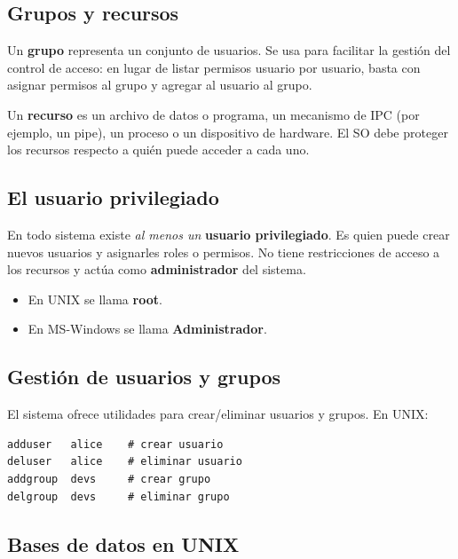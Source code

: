 \documentclass[11pt,a4paper]{article}
\begin{document}
\subsection{Grupos y recursos}

\begin{definicion}
Un \textbf{grupo} representa un conjunto de usuarios. Se usa para
facilitar la gestión del control de acceso: en lugar de listar
permisos usuario por usuario, basta con asignar permisos al grupo y
agregar al usuario al grupo.
\end{definicion}

Un \textbf{recurso} es un archivo de datos o programa, un mecanismo de
IPC (por ejemplo, un pipe), un proceso o un dispositivo de hardware.
El SO debe proteger los recursos respecto a quién puede acceder a
cada uno.

\subsection{El usuario privilegiado}

\begin{importante}
En todo sistema existe \emph{al menos un} \textbf{usuario privilegiado}.
Es quien puede crear nuevos usuarios y asignarles roles o permisos. No
tiene restricciones de acceso a los recursos y actúa como
\textbf{administrador} del sistema.
\begin{itemize}[leftmargin=*,nosep]
    \item En UNIX se llama \textbf{root}.
    \item En MS-Windows se llama \textbf{Administrador}.
\end{itemize}
\end{importante}

\subsection{Gestión de usuarios y grupos}

El sistema ofrece utilidades para crear/eliminar usuarios y grupos.
En UNIX:

\begin{lstlisting}[style=shellstyle]
adduser   alice    # crear usuario
deluser   alice    # eliminar usuario
addgroup  devs     # crear grupo
delgroup  devs     # eliminar grupo
\end{lstlisting}

\subsection{Bases de datos en UNIX}
\end{document}
